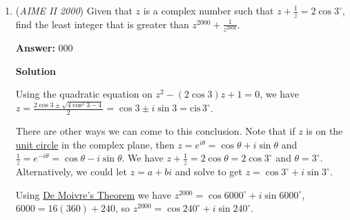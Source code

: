\begin{enumerate}
 


 



\textbf{Solution 4}

Let $E$ be the intersection of the diagonals. Since the diagonals are perpendicular, applying the Pythagorean Theorem multiple times we have
 \begin{align*} BC^2&=BE^2+CE^2 \\ &=(AB^2-AE^2)+(CD^2-DE^2) \\ &=CD^2+\sqrt{11}^2-(AE^2+DE^2) \\ &=CD^2+11-AD^2 \\ &=CD^2-990 \end{align*}
Followed by dropping the perpendicular like in solution 1, we obtain system of equation
 \[BC^2=CD^2-990\]
 \[BC^2+CD^2-2\sqrt{11}CD=990\]Rearrange the first equation yields
 \[CD^2-BC^2=990\]Equating it with the second equation we have
 \[CD^2-BC^2=BC^2+CD^2-2\sqrt{11}CD\]Which gives $CD=\frac{BC^2}{\sqrt{11}}$.Substituting into equation 1 obtains the quadratic in terms of $BC^2$
 \[(BC^2)^2-11BC^2-11\cdot990=0\]Solving the quadratic to obtain $BC^2=\boxed{110}$.

 


	\item (\textit{AIME II 2000}) Given that $z$ is a complex number such that $z+\frac 1z=2\cos 3^\circ$, find the least integer that is greater than $z^{2000}+\frac 1{z^{2000}}$.


 
 \textbf{Answer: }000



\textbf{Solution}

Using the quadratic equation on $z^2 - (2 \cos 3 )z + 1 = 0$, we have $z = \frac{2\cos 3 \pm \sqrt{4\cos^2 3 - 4}}{2} = \cos 3 \pm i\sin 3 = \text{cis}\,3^{\circ}$.

 There are other ways we can come to this conclusion. Note that if $z$ is on the \href{https://artofproblemsolving.com/wiki/index.php?title=Unit\_circle}{unit circle} in the complex plane, then $z = e^{i\theta} = \cos \theta + i\sin \theta$  and $\frac 1z= e^{-i\theta} = \cos \theta - i\sin \theta$. We have $z+\frac 1z = 2\cos \theta = 2\cos 3^\circ$ and $\theta = 3^\circ$. Alternatively, we could let $z = a + bi$ and solve to get $z=\cos 3^\circ + i\sin 3^\circ$.

 
Using \href{https://artofproblemsolving.com/wiki/index.php?title=De\_Moivre\%27s\_Theorem}{De Moivre's Theorem} we have $z^{2000} = \cos 6000^\circ + i\sin 6000^\circ$, $6000 = 16(360) + 240$, so $z^{2000} = \cos 240^\circ + i\sin 240^\circ$.


\end{enumerate}
